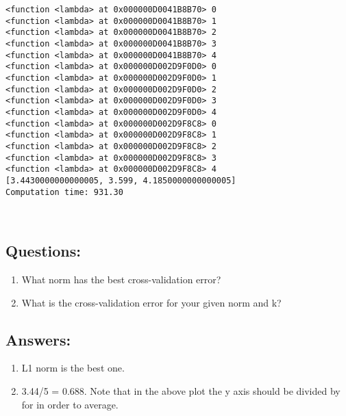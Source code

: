 \documentclass[11pt]{article}
\begin{document}
    \begin{Verbatim}[commandchars=\\\{\}]
<function <lambda> at 0x000000D0041B8B70> 0
<function <lambda> at 0x000000D0041B8B70> 1
<function <lambda> at 0x000000D0041B8B70> 2
<function <lambda> at 0x000000D0041B8B70> 3
<function <lambda> at 0x000000D0041B8B70> 4
<function <lambda> at 0x000000D002D9F0D0> 0
<function <lambda> at 0x000000D002D9F0D0> 1
<function <lambda> at 0x000000D002D9F0D0> 2
<function <lambda> at 0x000000D002D9F0D0> 3
<function <lambda> at 0x000000D002D9F0D0> 4
<function <lambda> at 0x000000D002D9F8C8> 0
<function <lambda> at 0x000000D002D9F8C8> 1
<function <lambda> at 0x000000D002D9F8C8> 2
<function <lambda> at 0x000000D002D9F8C8> 3
<function <lambda> at 0x000000D002D9F8C8> 4
[3.4430000000000005, 3.599, 4.1850000000000005]
Computation time: 931.30

    \end{Verbatim}

    \begin{center}
    \end{center}
    { \hspace*{\fill} \\}
    
    \hypertarget{questions}{%
\subsection{Questions:}\label{questions}}

\begin{enumerate}
\def\labelenumi{(\arabic{enumi})}
\item
  What norm has the best cross-validation error?
\item
  What is the cross-validation error for your given norm and k?
\end{enumerate}

    \hypertarget{answers}{%
\subsection{Answers:}\label{answers}}

\begin{enumerate}
\def\labelenumi{(\arabic{enumi})}
\item
  L1 norm is the best one.
\item
  3.44/5 = 0.688. Note that in the above plot the y axis should be
  divided by for in order to average.
\end{enumerate}
\end{document}
